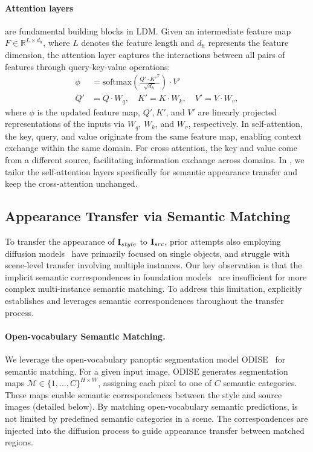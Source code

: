 
\paragraph{\bf{Attention layers}} are fundamental building blocks in LDM. Given an intermediate feature map $F \in \mathbb{R}^{L \times d_h}$, where $L$ denotes the feature length and $d_h$ represents the feature dimension, the attention layer captures the interactions between all pairs of features through query-key-value operations:
\begin{equation}
\begin{split}
\phi &= \text{softmax}\left(\frac{Q'\cdot K'^T}{\sqrt{d_h}}\right)\cdot V' \\
Q' &= Q \cdot W_q, \quad K' = K \cdot W_k, \quad V' = V \cdot W_v,
\end{split}
\end{equation}
where $\phi$ is the updated feature map, $Q', K'$, and $V'$ are linearly projected representations of the inputs via $W_q$, $W_k$, and $W_v$, respectively. In self-attention, the key, query, and value originate from the same feature map, enabling context exchange within the same domain. For cross attention, the key and value come from a different source, facilitating information exchange across domains. In \ours, we tailor the self-attention layers specifically for semantic appearance transfer and keep the cross-attention unchanged.


\subsection{Appearance Transfer via Semantic Matching}
\label{sec:attention_appearance_transfer}
To transfer the appearance of $\mathbf{I}_{style}$ to $\mathbf{I}_{src}$, prior attempts also employing diffusion models~\cite{alaluf2024cross,zhang2023tale,cheng2024zeroshot} have primarily focused on single objects, and struggle with scene-level transfer involving multiple instances. Our key observation is that the implicit semantic correspondences in foundation models~\cite{rombach2022latentdiffusion,oquab2023dinov2} are insufficient for more complex multi-instance semantic matching. To address this limitation, \ours explicitly establishes and leverages semantic correspondences throughout the transfer process.



\paragraph{Open-vocabulary Semantic Matching.}
We leverage the open-vocabulary panoptic segmentation model ODISE~\cite{xu2023open} for semantic matching. For a given input image, ODISE generates segmentation maps $\mathcal{M} \in \{1, \ldots, C\}^{H \times W}$, assigning each pixel to one of $C$ semantic categories. These maps enable semantic correspondences between the style and source images (detailed below). By matching open-vocabulary semantic predictions, \ours is not limited by predefined semantic categories in a scene. The correspondences are injected into the diffusion process to guide appearance transfer between matched regions.



